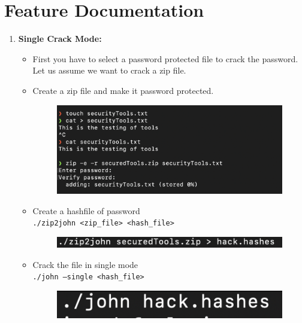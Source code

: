 \documentclass[12pt, A4Paper]{article}
\begin{document}
\section{Feature Documentation}
\begin{enumerate}
    \item \textbf{\large{Single Crack Mode:}}
    \begin{itemize}
        \item First you have to select a password protected file to crack the password. Let us assume we want to crack a zip file. 
        \item Create a zip file and make it password protected. \\
         \begin{figure}[H]
            \centering
            \includegraphics[width=\textwidth]{images/0.png}
        \end{figure}
        \item Create a hashfile of password \\
        \texttt 
        {./zip2john <zip\_file> <hash\_file>}\\ 
         \begin{figure}[H]
            \centering
            \includegraphics{images/1.png}
        \end{figure}
        \item Crack the file in single mode \\
        \texttt 
        {./john --single <hash\_file>}\\ 
         \begin{figure}[H]
            \centering
            \includegraphics{images/2.png}
        \end{figure}

\end{itemize}
\end{enumerate}
\end{document}
